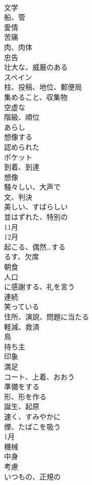 \documentclass[8pt]{extreport}
\begin{document}
\begin{CJK}{UTF8}{min}
\\	文学	
\\	船、管	
\\	愛情	
\\	苦痛	
\\	肉、肉体	
\\	忠告	
\\	壮大な、威厳のある	
\\	スペイン	
\\	柱、投稿、地位、郵便局	
\\	集めること、収集物	
\\	空虚な	
\\	階級、順位	
\\	あらし	
\\	想像する	
\\	認められた	
\\	ポケット	
\\	到着、到達	
\\	想像	
\\	騒々しい、大声で	
\\	文、判決	
\\	美しい、すばらしい	
\\	並はずれた、特別の	
\\	11月	
\\	12月	
\\	起こる、偶然…する	
\\	るす、欠席	
\\	朝食	
\\	人口	
\\	に感謝する、礼を言う	
\\	連続	
\\	笑っている	
\\	住所、演説、問題に当たる	
\\	軽減、救済	
\\	鳥	
\\	持ち主	
\\	印象	
\\	満足	
\\	コート、上着、おおう	
\\	準備をする	
\\	形、形を作る	
\\	誕生、起原	
\\	速く、すみやかに	
\\	煙、たばこを吸う	
\\	1月	
\\	機械	
\\	中身	
\\	考慮	
\\	いつもの、正規の	

\end{CJK}
\end{document}
